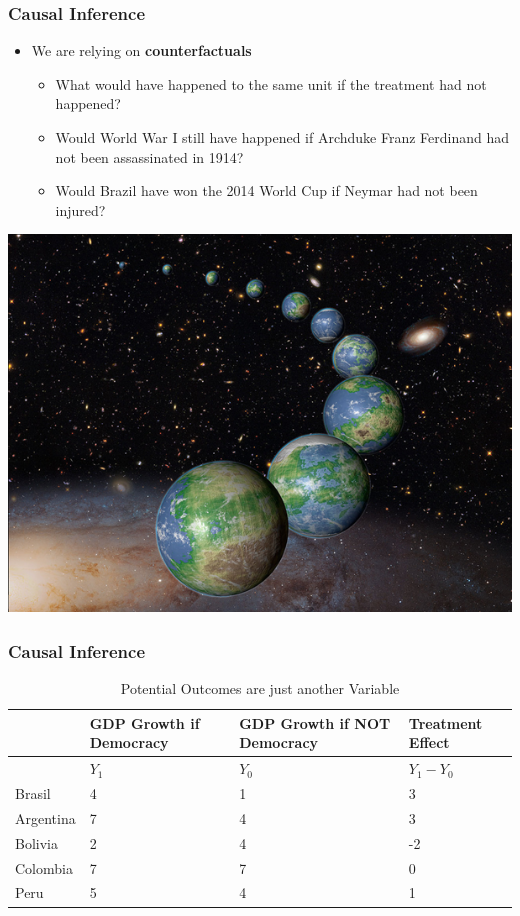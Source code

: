 \documentclass[xcolor=x11names,compress]{beamer}\usepackage[]{graphicx}\usepackage[]{color}
\renewcommand{\(}{\begin{columns}}
\renewcommand{\)}{\end{columns}}
\newcommand{\<}[1]{\begin{column}{#1}}
\renewcommand{\>}{\end{column}}
\begin{document}
\begin{frame}
\frametitle{Causal Inference}
\begin{itemize}
\item We are relying on \textbf{counterfactuals}
\pause
\begin{itemize}
\item What would have happened to the same unit if the treatment had not happened?
\pause
\item Would World War I still have happened if Archduke Franz Ferdinand had not been assassinated in 1914?
\pause
\item Would Brazil have won the 2014 World Cup if Neymar had not been injured?
\pause
\end{itemize}
\end{itemize}
\end{frame}

\includegraphics[width=1\textwidth]{figure/Multiverse.png}

\begin{frame}
\frametitle{Causal Inference}
\footnotesize
\begin{table}[htbp]
  \centering
  \caption{Potential Outcomes are just another Variable}
    \begin{tabular}{|p{2.4cm}|p{2.4cm}|p{2.4cm}|p{2.4cm}|}
    \hline
          & \multicolumn{1}{p{2.4cm}|}{GDP Growth if Democracy} & \multicolumn{1}{p{2.4cm}|}{GDP Growth if  NOT Democracy} &  Treatment Effect\bigstrut\\
    \hline
          & \multicolumn{1}{l|}{$Y_1$} & \multicolumn{1}{l|}{$Y_0$} & \multicolumn{1}{l|}{$Y_1-Y_0$} \bigstrut\\
    \hline
    Brasil & 4     & 1     & 3 \bigstrut\\
    \hline
    Argentina & 7    & 4     & 3 \bigstrut\\
    \hline
    Bolivia & 2     & 4     & -2 \bigstrut\\
    \hline
    Colombia & 7    & 7    & 0 \bigstrut\\
    \hline
    Peru & 5     & 4     & 1 \bigstrut\\
    \hline
    \end{tabular}%
  \label{tab:addlabel}%
\end{table}%
\normalsize
\end{frame}
\end{document}
